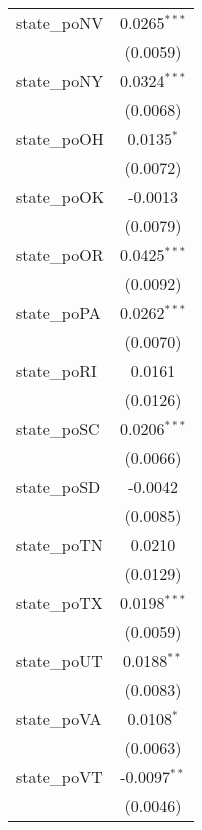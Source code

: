 \begin{tabular}{lc}
   state\_poNV                        & 0.0265$^{***}$\\   
                                      & (0.0059)\\   
   state\_poNY                        & 0.0324$^{***}$\\   
                                      & (0.0068)\\   
   state\_poOH                        & 0.0135$^{*}$\\   
                                      & (0.0072)\\   
   state\_poOK                        & -0.0013\\   
                                      & (0.0079)\\   
   state\_poOR                        & 0.0425$^{***}$\\   
                                      & (0.0092)\\   
   state\_poPA                        & 0.0262$^{***}$\\   
                                      & (0.0070)\\   
   state\_poRI                        & 0.0161\\   
                                      & (0.0126)\\   
   state\_poSC                        & 0.0206$^{***}$\\   
                                      & (0.0066)\\   
   state\_poSD                        & -0.0042\\   
                                      & (0.0085)\\   
   state\_poTN                        & 0.0210\\   
                                      & (0.0129)\\   
   state\_poTX                        & 0.0198$^{***}$\\   
                                      & (0.0059)\\   
   state\_poUT                        & 0.0188$^{**}$\\   
                                      & (0.0083)\\   
   state\_poVA                        & 0.0108$^{*}$\\   
                                      & (0.0063)\\   
   state\_poVT                        & -0.0097$^{**}$\\   
                                      & (0.0046)\\   

\end{tabular}

